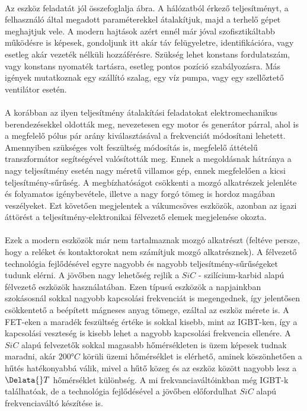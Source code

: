 \paragraph{}
Az eszköz feladatát jól összefoglalja  ábra. A hálózatból érkező teljesítményt, a felhasználó által megadott paraméterekkel átalakítjuk, majd a terhelő gépet meghajtjuk vele. A modern hajtások azért ennél már jóval szofisztikáltabb működésre is képesek, gondoljunk itt akár táv felügyeletre, identifikációra, vagy esetleg akár vezeték nélküli hozzáférésre. Szükség lehet konstans fordulatszám, vagy konstans nyomaték tartásra, esetleg pontos pozíció szabályozásra. Más igények mutatkoznak egy szállító szalag, egy víz pumpa, vagy egy szellőztető ventilátor esetén.

\paragraph{}
A korábban az ilyen teljesítmény átalakítási feladatokat elektromechanikus berendezésekkel oldották meg, nevezetesen egy motor és generátor párral, ahol is a megfelelő pólus pár arány kiválasztásával a frekvenciát módosítani lehetett. Amennyiben szükséges volt feszültség módosítás is, megfelelő áttételű transzformátor segítségével valósították meg. Ennek a megoldásnak hátránya a nagy teljesítmény esetén nagy méretű villamos gép, ennek megfelelően a kicsi teljesítmény-sűrűség. A megbízhatóságot csökkenti a mozgó alkatrészek jelenléte és folyamatos igénybevétele, illetve a nagy forgó tömeg is hordoz magában veszélyeket. Ezt követően megjelentek a vákumcsöves eszközök, azonban az igazi áttörést a teljesítmény-elektronikai félvezető elemek megjelenése okozta.

\paragraph{}
Ezek a modern eszközök már nem tartalmaznak mozgó alkatrészt (feltéve persze, hogy a reléket és kontaktorokat nem számítjuk mozgó alkatrésznek). A félvezető technológia fejlődésével egyre nagyobb és nagyobb teljesítmény-sűrűségeket tudunk elérni. A jövőben nagy lehetőség rejlik a $SiC$ - szilícium-karbid alapú félvezető eszközök használatában. Ezen típusú eszközök a napjainkban szokásosnál sokkal nagyobb kapcsolási frekvenciát is megengednek, így jelentősen csökkentető a beépített mágneses anyag tömege, ezáltal az eszköz mérete is. A FET-eken a maradék feszültség értéke is sokkal kisebb, mint az IGBT-ken, így a kapcsolási veszteség is kisebb lehet a nagyobb kapcsolási frekvencia ellenére. A $SiC$ alapú felvezetők sokkal magasabb hőmérsékleten is üzem képesek tudnak maradni, akár $200 °C$ körüli üzemi hőmérséklet is elérhető, aminek köszönhetően a hűtés hatékonyabbá válik, mivel a hűtő közeg és az eszköz között nagyobb lesz a $\Delata{}T$ hőmérséklet különbség. A mi frekvanciaváltóinkban még IGBT-k találhatóak, de a technológia fejlődésével a jövőben előfordulhat $SiC$ alapú frekvenciaváltó készítése is.

